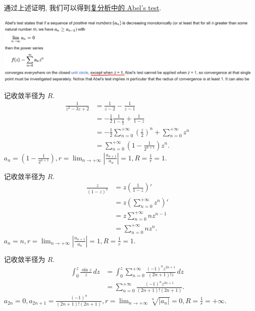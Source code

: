 \documentclass{homework}
\begin{document}
通过上述证明, 我们可以得到\href{https://en.wikipedia.org/wiki/Abel%27s_test#Abel's_test_in_complex_analysis}{复分析中的 Abel's test}.

\begin{center}
  \includegraphics[width=.9\columnwidth]{figure/abel.png}
\end{center}

记收敛半径为 \(R\).
\begin{align*}
  \frac{1}{z^2-3z+2}&=\frac{1}{z-2}-\frac{1}{z-1}\\
  &=-\frac{1}{2}\frac{1}{1-\frac{z}{2}}+\frac{1}{1-z}\\
  &=-\frac{1}{2}\sum_{n=0}^{+\infty}\left(\frac{z}{2}\right)^n+\sum_{n=0}^{+\infty}z^n\\
  &=\sum_{n=0}^{+\infty}\left(1-\frac{1}{2^{n+1}}\right)z^n.
\end{align*}
\(a_n=(1-\frac{1}{2^{n+1}}), r=\lim_{n\to+\infty}|\frac{a_{n+1}}{a_n}|=1, R=\frac{1}{r}=1\).

记收敛半径为 \(R\).
\begin{align*}
  \frac{z}{(1-z)^2}&=z\left(\frac{1}{1-z}\right)'\\
  &=z\left(\sum_{n=0}^{+\infty}z^n\right)'\\
  &=z\sum_{n=0}^{+\infty}nz^{n-1}\\
  &=\sum_{n=0}^{+\infty}nz^n.
\end{align*}
\(a_n=n, r=\lim_{n\to+\infty}|\frac{a_{n+1}}{a_n}|=1, R=\frac{1}{r}=1\).

记收敛半径为 \(R\).
\begin{align*}
  \int_{0}^{z}\frac{\sin z}{z}\,dz&=\int_{0}^{z}\sum_{n=0}^{+\infty}\frac{(-1)^nz^{2n+1}}{(2n+1)!z}\,dz\\
  &=\sum_{n=0}^{+\infty}\frac{(-1)^nz^{2n+1}}{(2n+1)!(2n+1)}.
\end{align*}
\(a_{2n}=0, a_{2n+1}=\frac{(-1)^n}{(2n+1)!(2n+1)}, r=\lim_{n\to+\infty}\sqrt[n]{|a_n|}=0, R=\frac{1}{r}=+\infty\).

\end{document}
